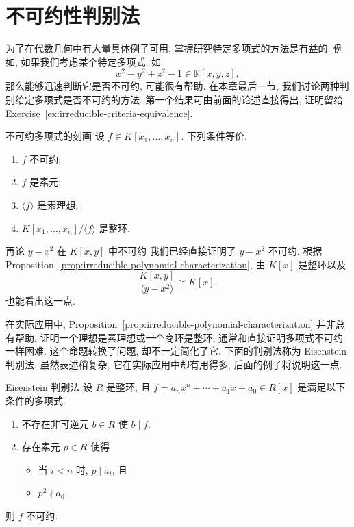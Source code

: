 \section{不可约性判别法}\label{sec:irreducibility-criteria}

为了在代数几何中有大量具体例子可用, 掌握研究特定多项式的方法是有益的. 例如, 如果我们考虑某个特定多项式, 如
\[
  x^{2}+y^{2}+z^{2}-1\in\mathbb{R}[x,y,z],
\]
那么能够迅速判断它是否不可约, 可能很有帮助. 在本章最后一节, 我们讨论两种判别给定多项式是否不可约的方法. 第一个结果可由前面的论述直接得出, 证明留给 Exercise~\ref{ex:irreducible-criteria-equivalence}.

\begin{Proposition}{不可约多项式的刻画}\label{prop:irreducible-polynomial-characterization}
  设 $f\in K[x_{1},\ldots,x_{n}]$. 下列条件等价.
  \begin{enumerate}[label=\arabic*.]
    \item $f$ 不可约;
    \item $f$ 是素元;
    \item $\langle f\rangle$ 是素理想;
    \item $K[x_{1},\ldots,x_{n}]/\langle f\rangle$ 是整环.
  \end{enumerate}
\end{Proposition}

\begin{Example}{{再论 \textmd{$y-x^{2}$} 在 \textmd{$K[x,y]$} 中不可约}}\label{ex:parabola-polynomial-irreducible-revisited}
  我们已经直接证明了 $y-x^{2}$ 不可约. 根据 Proposition~\ref{prop:irreducible-polynomial-characterization}, 由 $K[x]$ 是整环以及
  \[
    \frac{K[x,y]}{\langle y-x^{2}\rangle}\cong K[x].
  \]
  也能看出这一点.
\end{Example}

在实际应用中, Proposition~\ref{prop:irreducible-polynomial-characterization} 并非总有帮助. 证明一个理想是素理想或一个商环是整环, 通常和直接证明多项式不可约一样困难. 这个命题转换了问题, 却不一定简化了它. 下面的判别法称为 Eisenstein 判别法. 虽然表述稍复杂, 它在实际应用中却有用得多, 后面的例子将说明这一点.

\begin{Proposition}{Eisenstein 判别法}\label{prop:eisenstein-criterion}
  设 $R$ 是整环, 且 $f=a_{n}x^{n}+\cdots+a_{1}x+a_{0}\in R[x]$ 是满足以下条件的多项式.
  \begin{enumerate}[label=\arabic*.]
    \item 不存在非可逆元 $b\in R$ 使 $b\mid f$.
    \item 存在素元 $p\in R$ 使得
      \begin{itemize}
        \item 当 $i<n$ 时, $p\mid a_{i}$, 且
        \item $p^{2}\nmid a_{0}$.
      \end{itemize}
  \end{enumerate}
  则 $f$ 不可约.
\end{Proposition}


